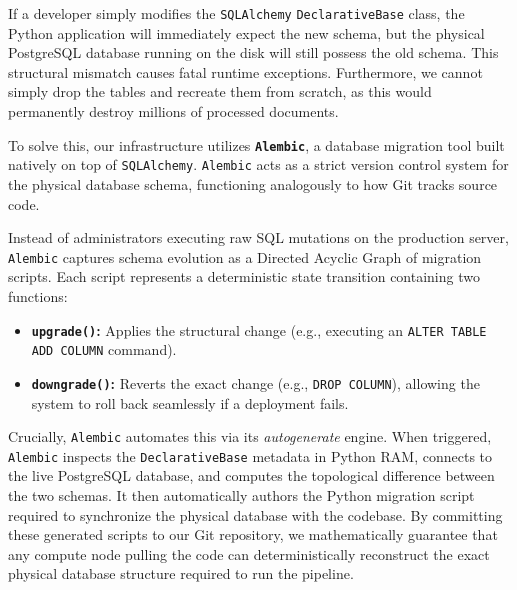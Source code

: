 If a developer simply modifies the \texttt{SQLAlchemy} \texttt{DeclarativeBase} class, the Python application will immediately expect the new schema, but the physical PostgreSQL database running on the disk will still possess the old schema. This structural mismatch causes fatal runtime exceptions. Furthermore, we cannot simply drop the tables and recreate them from scratch, as this would permanently destroy millions of processed documents.

To solve this, our infrastructure utilizes \textbf{\texttt{Alembic}}, a database migration tool built natively on top of \texttt{SQLAlchemy}. \texttt{Alembic} acts as a strict version control system for the physical database schema, functioning analogously to how Git tracks source code.

Instead of administrators executing raw SQL mutations on the production server, \texttt{Alembic} captures schema evolution as a Directed Acyclic Graph of migration scripts. Each script represents a deterministic state transition containing two functions:
\begin{itemize}
    \item \textbf{\texttt{upgrade()}:} Applies the structural change (e.g., executing an \texttt{ALTER TABLE ADD COLUMN} command).
    \item \textbf{\texttt{downgrade()}:} Reverts the exact change (e.g., \texttt{DROP COLUMN}), allowing the system to roll back seamlessly if a deployment fails.
\end{itemize}

Crucially, \texttt{Alembic} automates this via its \textit{autogenerate} engine. When triggered, \texttt{Alembic} inspects the \texttt{DeclarativeBase} metadata in Python RAM, connects to the live PostgreSQL database, and computes the topological difference between the two schemas. It then automatically authors the Python migration script required to synchronize the physical database with the codebase. By committing these generated scripts to our Git repository, we mathematically guarantee that any compute node pulling the code can deterministically reconstruct the exact physical database structure required to run the pipeline.


